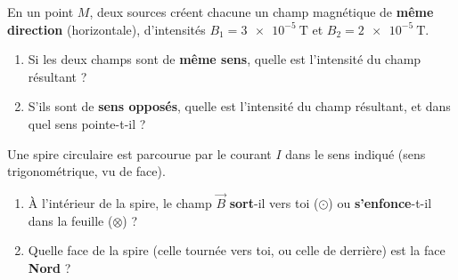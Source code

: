 \documentclass[11pt,a4paper]{article}
\newcommand{\vv}[1]{\vec{#1}}\newcommand{\ds}{\displaystyle}
\begin{document}
\begin{exo}
En un point $M$, deux sources créent chacune un champ magnétique de \textbf{même direction}
(horizontale), d'intensités $B_1=\qty{3e-5}{\tesla}$ et $B_2=\qty{2e-5}{\tesla}$.
\begin{enumerate}[label=\alph*)]
  \item Si les deux champs sont de \textbf{même sens}, quelle est l'intensité du champ résultant ?
  \item S'ils sont de \textbf{sens opposés}, quelle est l'intensité du champ résultant, et dans quel
        sens pointe-t-il ?
\end{enumerate}
\end{exo}

\begin{exo}[sens de $\vv{B}$ dans une spire]
Une spire circulaire est parcourue par le courant $I$ dans le sens indiqué (sens
trigonométrique, vu de face).
\begin{center}
\end{center}
\begin{enumerate}[label=\alph*)]
  \item À l'intérieur de la spire, le champ $\vv{B}$ \textbf{sort}-il vers toi ($\odot$) ou
        \textbf{s'enfonce}-t-il dans la feuille ($\otimes$) ?
  \item Quelle face de la spire (celle tournée vers toi, ou celle de derrière) est la face
        \textbf{Nord} ?
\end{enumerate}
\end{exo}
\end{document}
